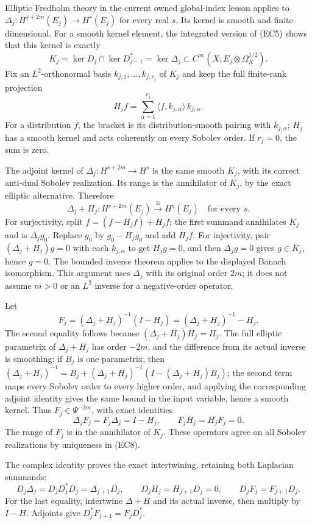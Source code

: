 \documentclass[
  11pt,
]{article}
\begin{document}
Elliptic Fredholm theory in the current owned global-index lesson
applies to \(\Delta_j:H^{s+2m}(E_j)\to H^s(E_j)\) for every real \(s\).
Its kernel is smooth and finite dimensional. For a smooth kernel
element, the integrated version of (EC5) shows that this kernel is
exactly \[
 K_j=\ker D_j\cap\ker D_{j-1}^*
     =\ker\Delta_j\subset C^\infty(X;E_j\otimes\Omega_X^{1/2}).
 \tag{EC6}
\] Fix an \(L^2\)-orthonormal basis \(k_{j,1},\ldots,k_{j,r_j}\) of
\(K_j\) and keep the full finite-rank projection \[
 H_j f=\sum_{\alpha=1}^{r_j}
             \langle f,k_{j,\alpha}\rangle\,k_{j,\alpha}.
 \tag{EC7}
\] For a distribution \(f\), the bracket is its distribution-smooth
pairing with \(k_{j,\alpha}\); \(H_j\) has a smooth kernel and acts
coherently on every Sobolev order. If \(r_j=0\), the sum is zero.

The adjoint kernel of \(\Delta_j:H^{s+2m}\to H^s\) is the same smooth
\(K_j\), with its correct anti-dual Sobolev realization. Its range is
the annihilator of \(K_j\), by the exact elliptic alternative. Therefore
\[
 \Delta_j+H_j:H^{s+2m}(E_j)\xrightarrow{\;\cong\;}H^s(E_j)
 \quad\text{for every }s.
 \tag{EC8}
\] For surjectivity, split \(f=(f-H_jf)+H_jf\); the first summand
annihilates \(K_j\) and is \(\Delta_jg_0\). Replace \(g_0\) by
\(g_0-H_jg_0\) and add \(H_jf\). For injectivity, pair
\((\Delta_j+H_j)g=0\) with each \(k_{j,\alpha}\) to get \(H_jg=0\), and
then \(\Delta_jg=0\) gives \(g\in K_j\), hence \(g=0\). The bounded
inverse theorem applies to the displayed Banach isomorphism. This
argument uses \(\Delta_j\) with its original order \(2m\); it does not
assume \(m>0\) or an \(L^2\) inverse for a negative-order operator.

Let \[
 F_j=(\Delta_j+H_j)^{-1}(I-H_j)
      =(\Delta_j+H_j)^{-1}-H_j.
 \tag{EC9}
\] The second equality follows because \((\Delta_j+H_j)H_j=H_j\). The
full elliptic parametrix of \(\Delta_j+H_j\) has order \(-2m\), and the
difference from its actual inverse is smoothing: if \(B_j\) is one
parametrix, then \((\Delta_j+H_j)^{-1}
 =B_j+(\Delta_j+H_j)^{-1}(I-(\Delta_j+H_j)B_j)\); the second term maps
every Sobolev order to every higher order, and applying the
corresponding adjoint identity gives the same bound in the input
variable, hence a smooth kernel. Thus \(F_j\in\Psi^{-2m}\), with exact
identities \[
 \Delta_jF_j=F_j\Delta_j=I-H_j,\qquad
 F_jH_j=H_jF_j=0.
 \tag{EC10}
\] The range of \(F_j\) is in the annihilator of \(K_j\). These
operators agree on all Sobolev realizations by uniqueness in (EC8).

The complex identity proves the exact intertwining, retaining both
Laplacian summands: \[
 D_j\Delta_j
  =D_jD_j^*D_j
  =\Delta_{j+1}D_j,\qquad
 D_jH_j=H_{j+1}D_j=0,\qquad
 D_jF_j=F_{j+1}D_j.
 \tag{EC11}
\] For the last equality, intertwine \(\Delta+H\) and its actual
inverse, then multiply by \(I-H\). Adjoints give
\(D_j^*F_{j+1}=F_jD_j^*\).
\end{document}
